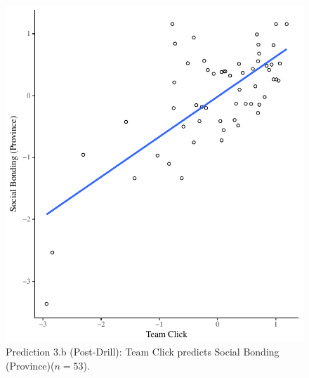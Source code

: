 \begin{CJK}{UTF8}{gbsn}











\begin{figure}
  \centering
    \includegraphics[width=0.5\linewidth,keepaspectratio] {images/groupClickTeamBondScatter}
    \caption{Prediction 3.b (Post-Drill): Team Click predicts Social Bonding (Province)($n = 53$).}
      \label{fig:groupClickTeamBondScatter}
\end{figure}




\end{CJK}

